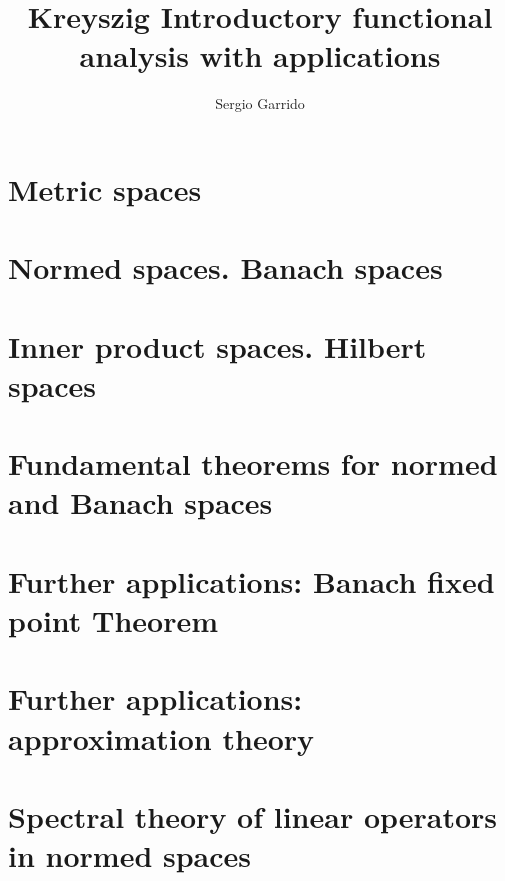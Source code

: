 \documentclass{bookSolutions}
\title{Kreyszig  Introductory functional analysis with applications}
\author{Sergio Garrido}
\begin{document}
\maketitle

\tableofcontents

\section{Metric spaces}







\section{Normed spaces. Banach spaces}











\section{Inner product spaces. Hilbert spaces}











\section{Fundamental theorems for normed and Banach spaces}


\section{Further applications: Banach fixed point Theorem}


\section{Further applications: approximation theory}


\section{Spectral theory of linear operators in normed spaces}

\end{document}
